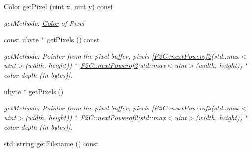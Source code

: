 \begin{DoxyCompactItemize}
\hyperlink{class_f2_c_1_1_color}{Color} \hyperlink{class_f2_c_1_1_bitmap_ad874bb351e5e102f2ed33deba702101f}{getPixel} (\hyperlink{namespace_f2_c_a58be2bac9eb3e3c99cb41b6008bf4fae}{uint} x, \hyperlink{namespace_f2_c_a58be2bac9eb3e3c99cb41b6008bf4fae}{uint} y) const 
\begin{DoxyCompactList}\small\item\em getMethode: \hyperlink{class_f2_c_1_1_color}{Color} of Pixel \item\end{DoxyCompactList}\item 
\hypertarget{class_f2_c_1_1_bitmap_a806f3f328dd852dfba680668ca447f42}{
const \hyperlink{namespace_f2_c_a74fad364688add30796d711e5635ac77}{ubyte} $\ast$ \hyperlink{class_f2_c_1_1_bitmap_a806f3f328dd852dfba680668ca447f42}{getPixels} () const }
\label{class_f2_c_1_1_bitmap_a806f3f328dd852dfba680668ca447f42}

\begin{DoxyCompactList}\small\item\em getMethode: Pointer from the pixel buffer, pixels \mbox{[}\hyperlink{namespace_f2_c_a60c6d5786600a7d7bfb8c4bfafa55419}{F2C::nextPowerof2}(std::max$<$uint$>$(width, height)) $\ast$ \hyperlink{namespace_f2_c_a60c6d5786600a7d7bfb8c4bfafa55419}{F2C::nextPowerof2}(std::max$<$uint$>$(width, height)) $\ast$ color depth (in bytes)\mbox{]}. \item\end{DoxyCompactList}\item 
\hypertarget{class_f2_c_1_1_bitmap_a2910bbe2b22ed45bacf4429a141a756a}{
\hyperlink{namespace_f2_c_a74fad364688add30796d711e5635ac77}{ubyte} $\ast$ \hyperlink{class_f2_c_1_1_bitmap_a2910bbe2b22ed45bacf4429a141a756a}{getPixels} ()}
\label{class_f2_c_1_1_bitmap_a2910bbe2b22ed45bacf4429a141a756a}

\begin{DoxyCompactList}\small\item\em getMethode: Pointer from the pixel buffer, pixels \mbox{[}\hyperlink{namespace_f2_c_a60c6d5786600a7d7bfb8c4bfafa55419}{F2C::nextPowerof2}(std::max$<$uint$>$(width, height)) $\ast$ \hyperlink{namespace_f2_c_a60c6d5786600a7d7bfb8c4bfafa55419}{F2C::nextPowerof2}(std::max$<$uint$>$(width, height)) $\ast$ color depth (in bytes)\mbox{]}. \item\end{DoxyCompactList}\item 
\hypertarget{class_f2_c_1_1_bitmap_a8d488e4029c06490e5b1b101a92b21b4}{
std::string \hyperlink{class_f2_c_1_1_bitmap_a8d488e4029c06490e5b1b101a92b21b4}{getFilename} () const }
\label{class_f2_c_1_1_bitmap_a8d488e4029c06490e5b1b101a92b21b4}


\end{DoxyCompactItemize}
